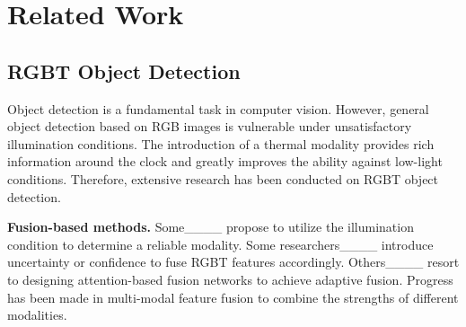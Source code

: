 \section{Related Work}
\label{sec:related}
\subsection{RGBT Object Detection}
Object detection is a fundamental task in computer vision. However, general object detection based on RGB images is vulnerable under unsatisfactory illumination conditions. The introduction of a thermal modality provides rich information around the clock and greatly improves the ability against low-light conditions. Therefore, extensive research has been conducted on RGBT object detection. 

\textbf{Fusion-based methods.} Some____ propose to utilize the illumination condition to determine a reliable modality. Some researchers____ introduce uncertainty or confidence to fuse RGBT features accordingly. Others____ resort to designing attention-based fusion networks to achieve adaptive fusion. Progress has been made in multi-modal feature fusion to combine the strengths of different modalities.

